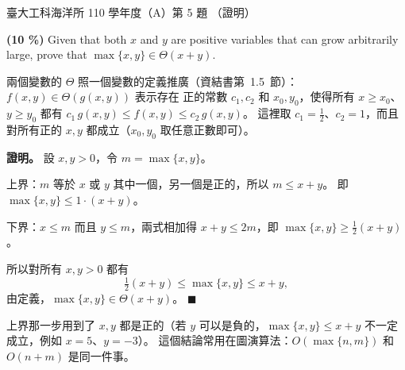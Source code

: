 \begin{pastexam}[label={px:ntu-110-esoe-ds-05}]{臺大工科海洋所 110 學年度（A）第 5 題}
（證明）

\textbf{(10 \%)} Given that both $x$ and $y$ are positive variables that can grow arbitrarily
large, prove that $\max\{x,y\}\in\Theta(x+y)$.
\end{pastexam}

\begin{pastsoln}
兩個變數的 $\Theta$ 照一個變數的定義推廣（資結書第~1.5~節）：$f(x, y) \in \Theta(g(x, y))$ 表示存在
正的常數 $c_1, c_2$ 和 $x_0, y_0$，使得所有 $x \ge x_0$、$y \ge y_0$ 都有
$c_1\, g(x, y) \le f(x, y) \le c_2\, g(x, y)$。 這裡取 $c_1 = \tfrac12$、$c_2 = 1$，而且對所有正的 $x, y$
都成立（$x_0, y_0$ 取任意正數即可）。

\textbf{證明。} 設 $x, y > 0$，令 $m = \max\{x, y\}$。

上界：$m$ 等於 $x$ 或 $y$ 其中一個，另一個是正的，所以 $m \le x + y$。 即 $\max\{x, y\} \le 1 \cdot (x + y)$。

下界：$x \le m$ 而且 $y \le m$，兩式相加得 $x + y \le 2m$，即 $\max\{x, y\} \ge \tfrac12 (x + y)$。

所以對所有 $x, y > 0$ 都有
\[
\tfrac12 (x + y) \le \max\{x, y\} \le x + y,
\]
由定義，$\max\{x, y\} \in \Theta(x + y)$。 \hfill$\blacksquare$

上界那一步用到了 $x, y$ 都是正的（若 $y$ 可以是負的，$\max\{x, y\} \le x + y$ 不一定成立，例如
$x = 5$、$y = -3$）。 這個結論常用在圖演算法：$O(\max\{n, m\})$ 和 $O(n + m)$ 是同一件事。
\end{pastsoln}
